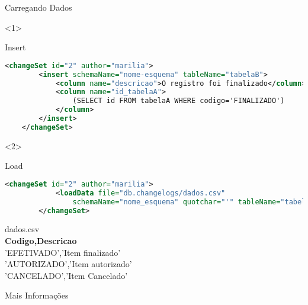 \begin{frame}[fragile]{Carregando Dados}
\begin{onlyenv}<1> 
\begin{block}{Insert}
    \begin{lstlisting}[language=XML]
    <changeSet id="2" author="marilia">
        <insert schemaName="nome-esquema" tableName="tabelaB">
            <column name="descricao">O registro foi finalizado</column>
            <column name="id_tabelaA">
                (SELECT id FROM tabelaA WHERE codigo='FINALIZADO')
            </column>
        </insert>
    </changeSet>
    \end{lstlisting}
\end{block}
\end{onlyenv}
\begin{onlyenv}<2>
\begin{block}{Load}
    \begin{lstlisting}[language=XML]
        <changeSet id="2" author="marilia">
            <loadData file="db.changelogs/dados.csv"
                schemaName="nome_esquema" quotchar="'" tableName="tabelaA"/>
        </changeSet>
    \end{lstlisting}
\end{block}
\normalsize \textcolor{jeans}{dados.csv} \\
\tiny \textbf{Codigo,Descricao} \\
\tiny 'EFETIVADO','Item finalizado' \\
\tiny 'AUTORIZADO','Item autorizado' \\
\tiny 'CANCELADO','Item Cancelado' \\
\end{onlyenv}
\end{frame}

\begin{frame}[c]{Mais Informações}
\end{frame}

